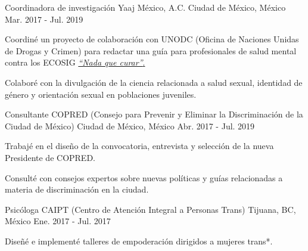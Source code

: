 \vspace{-3.2mm}
\begin{cventries}
    \cventry
        {Coordinadora de investigación}
        {Yaaj México, A.C.}
        {Ciudad de México, México}
        {Mar. 2017 - Jul. 2019}
        {
            \begin{cvitems}
            \item {Coordiné un proyecto de colaboración con UNODC (Oficina de Naciones Unidas de Drogas y Crimen) para redactar una guía para profesionales de salud mental contra los ECOSIG \href{https://www.unodc.org/documents/mexicoandcentralamerica/2019/GUIAECOSIGFINAL-compressed.pdf}{\textit{``Nada que curar''}.}}
                \item {Colaboré con la divulgación de la ciencia relacionada a salud sexual, identidad de género y orientación sexual en poblaciones juveniles.}
            \end{cvitems}
        }
    \cventry
        {Consultante}
        {COPRED (Consejo para Prevenir y Eliminar la Discriminación de la Ciudad de México)}
        {Ciudad de México, México}
        {Abr. 2017 - Jul. 2019}
        {
            \begin{cvitems}
                \item {Trabajé en el diseño de la convocatoria, entrevista y selección de la nueva Presidente de COPRED.}
                \item {Consulté con consejos expertos sobre nuevas políticas y guías relacionadas a materia de discriminación en la ciudad.}
            \end{cvitems}
        }
    \cventry
        {Psicóloga}
        {CAIPT (Centro de Atención Integral a Personas Trans)}
        {Tijuana, BC, México}
        {Ene. 2017 - Jul. 2017}
        {
            \begin{cvitems}
                \item {Diseñé e implementé talleres de empoderación dirigidos a mujeres trans*.}
            \end{cvitems}
        }
\end{cventries}
\vspace{-3.2mm}
